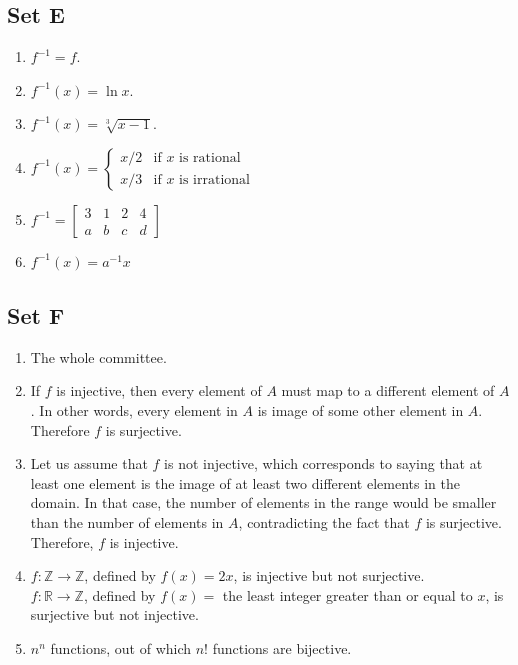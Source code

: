 \documentclass{article}
\begin{document}
\subsection{Set E}
\begin{enumerate}
    \item $f^{-1} = f$.

    \item $f^{-1}(x) = \ln x$.

    \item $f^{-1}(x) = \sqrt[3]{x - 1}$.

    \item $f^{-1}(x) = \begin{cases}
        x/2 & \text{if $x$ is rational} \\
        x/3 & \text{if $x$ is irrational}
    \end{cases}$

    \item $f^{-1} = \begin{bmatrix}
        3 & 1 & 2 & 4 \\
        a & b & c & d
    \end{bmatrix}$

    \item $f^{-1}(x) = a^{-1}x$
\end{enumerate}

\subsection{Set F}
\begin{enumerate}
    \item The whole committee.

    \item If $f$ is injective, then every element of $A$ must map to a different element of $A$. In other words, every element in $A$ is image of some other element in $A$. Therefore $f$ is surjective.

    \item Let us assume that $f$ is not injective, which corresponds to saying that at least one element is the image of at least two different elements in the domain. In that case, the number of elements in the range would be smaller than the number of elements in $A$, contradicting the fact that $f$ is surjective. Therefore, $f$ is injective.

    \item $f: \mathbb{Z} \to \mathbb{Z}$, defined by $f(x) = 2x$, is injective but not surjective.\\
    $f: \mathbb{R} \to \mathbb{Z}$, defined by $f(x) = $ the least integer greater than or equal to $x$, is surjective but not injective.

    \item $n^n$ functions, out of which $n!$ functions are bijective.
\end{enumerate}
\end{document}

